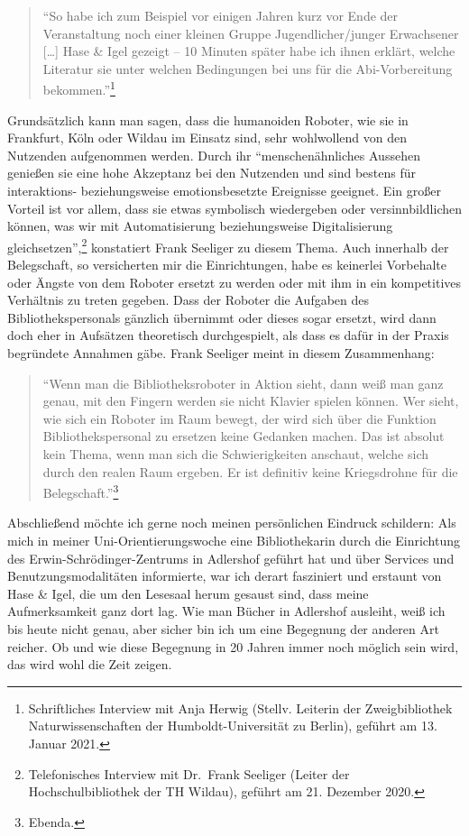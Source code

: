 \documentclass[a4paper,
fontsize=11pt,
oneside,
numbers=noperiodatend,
parskip=half-,
bibliography=totoc,
final
]{scrartcl}
\begin{document}
 \begin{quote} 
\enquote{So habe ich zum Beispiel vor einigen
Jahren kurz vor Ende der Veranstaltung noch einer kleinen Gruppe
Jugendlicher/junger Erwachsener {[}\ldots{]} Hase \& Igel gezeigt -- 10
Minuten später habe ich ihnen erklärt, welche Literatur sie unter
welchen Bedingungen bei uns für die Abi-Vorbereitung
bekommen.}\footnote{Schriftliches Interview mit Anja Herwig (Stellv.
  Leiterin der Zweigbibliothek Naturwissenschaften der
  Humboldt-Universität zu Berlin), geführt am 13. Januar 2021.}
  \end{quote} 

Grundsätzlich kann man sagen, dass die humanoiden Roboter, wie sie in
Frankfurt, Köln oder Wildau im Einsatz sind, sehr wohlwollend von den
Nutzenden aufgenommen werden. Durch ihr \enquote{menschenähnliches
Aussehen genießen sie eine hohe Akzeptanz bei den Nutzenden und sind
bestens für interaktions- beziehungsweise emotionsbesetzte Ereignisse
geeignet. Ein großer Vorteil ist vor allem, dass sie etwas symbolisch
wiedergeben oder versinnbildlichen können, was wir mit Automatisierung
beziehungsweise Digitalisierung gleichsetzen},\footnote{Telefonisches
  Interview mit Dr.~Frank Seeliger (Leiter der Hochschulbibliothek der
  TH Wildau), geführt am 21. Dezember 2020.} konstatiert Frank Seeliger
zu diesem Thema. Auch innerhalb der Belegschaft, so versicherten mir die
Einrichtungen, habe es keinerlei Vorbehalte oder Ängste von dem Roboter
ersetzt zu werden oder mit ihm in ein kompetitives Verhältnis zu treten
gegeben. Dass der Roboter die Aufgaben des Bibliothekspersonals gänzlich
übernimmt oder dieses sogar ersetzt, wird dann doch eher in Aufsätzen
theoretisch durchgespielt, als dass es dafür in der Praxis begründete
Annahmen gäbe. Frank Seeliger meint in diesem Zusammenhang:

\begin{quote}
\enquote{Wenn man die Bibliotheksroboter in Aktion sieht, dann weiß man
ganz genau, mit den Fingern werden sie nicht Klavier spielen können. Wer
sieht, wie sich ein Roboter im Raum bewegt, der wird sich über die
Funktion Bibliothekspersonal zu ersetzen keine Gedanken machen. Das ist
absolut kein Thema, wenn man sich die Schwierigkeiten anschaut, welche
sich durch den realen Raum ergeben. Er ist definitiv keine Kriegsdrohne
für die Belegschaft.}\footnote{Ebenda.}
\end{quote}

Abschließend möchte ich gerne noch meinen persönlichen Eindruck
schildern: Als mich in meiner Uni-Orientierungswoche eine Bibliothekarin
durch die Einrichtung des Erwin-Schrödinger-Zentrums in Adlershof
geführt hat und über Services und Benutzungsmodalitäten informierte, war
ich derart fasziniert und erstaunt von Hase \& Igel, die um den Lesesaal
herum gesaust sind, dass meine Aufmerksamkeit ganz dort lag. Wie man
Bücher in Adlershof ausleiht, weiß ich bis heute nicht genau, aber
sicher bin ich um eine Begegnung der anderen Art reicher. Ob und wie
diese Begegnung in 20 Jahren immer noch möglich sein wird, das wird wohl
die Zeit zeigen.
\end{document}
